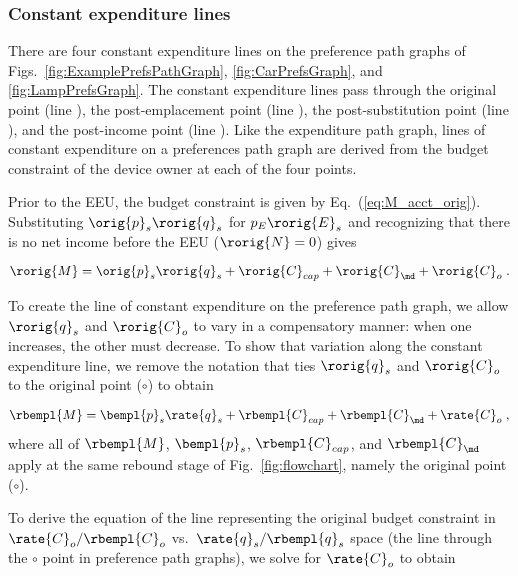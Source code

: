 \subsubsection{Constant expenditure lines} 
\label{sec:pref_graph_constant_expenditure_lines}

There are four constant expenditure lines on the preference path graphs of
Figs.~\ref{fig:ExamplePrefsPathGraph}, \ref{fig:CarPrefsGraph}, and \ref{fig:LampPrefsGraph}.
The constant expenditure lines pass through 
the original point (line \circcirc{}), 
the post-emplacement point (line \starstar{}), 
the post-substitution point (line \hathat{}), and 
the post-income point (line \barbar{}).
Like the expenditure path graph, 
lines of constant expenditure on a preferences path graph 
are derived from the budget constraint of the device owner
at each of the four points.

Prior to the EEU, the budget constraint is given by Eq.~(\ref{eq:M_acct_orig}).
Substituting $\orig{p}_s \rorig{q}_s$ for $p_E \rorig{E}_s$ and 
recognizing that there is no net income before the EEU
($\rorig{N} = 0$) gives

\begin{equation}
  \rorig{M} = \orig{p}_s \rorig{q}_s + \rorig{C}_{cap} + \rorig{C}_{\md} + \rorig{C}_o \; .
\end{equation}

To create the line of constant expenditure on the preference path graph, 
we allow $\rorig{q}_s$ and $\rorig{C}_o$ to vary in a compensatory manner:
when one increases, the other must decrease.  
To show that variation along the constant expenditure line, 
we remove the notation that ties $\rorig{q}_s$ and $\rorig{C}_o$
to the original point ($\circ$) to obtain

\begin{equation}
  \rbempl{M} = \bempl{p}_s \rate{q}_s + \rbempl{C}_{cap} + \rbempl{C}_{\md} + \rate{C}_o \; , 
\end{equation}
%
where all of $\rbempl{M}$, $\bempl{p}_s$, $\rbempl{C}_{cap}$, and $\rbempl{C}_{\md}$
apply at the same rebound stage of Fig.~\ref{fig:flowchart}, 
namely the original point ($\circ$).

To derive the equation of the line representing the original budget constraint 
in $\rate{C}_o/\rbempl{C}_o$ vs.\ $\rate{q}_s/\rbempl{q}_s$ space
(the \circcirc{} line through the $\circ$ point
in preference path graphs), 
we solve for $\rate{C}_o$ to obtain


